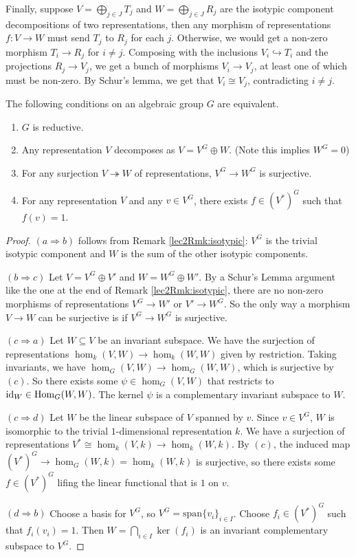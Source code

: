 \begin{remark}
 Finally, suppose $V=\bigoplus_{j\in J}T_j$ and $W=\bigoplus_{j\in J} R_j$ are the isotypic component decompositions of two representations, then any morphism of representations $f\colon V\to W$ must send $T_j$ to $R_j$ for each $j$. Otherwise, we would get a non-zero morphism $T_i\to R_j$ for $i\neq j$. Composing with the inclusions $V_i\hookrightarrow T_i$ and the projections $R_j\to V_j$, we get a bunch of morphisms $V_i\to V_j$, at least one of which must be non-zero. By Schur's lemma, we get that $V_i\cong V_j$, contradicting $i\neq j$.
\end{remark}

\begin{proposition}
 The following conditions on an algebraic group $G$ are equivalent.
 \begin{enumerate}[label=\alph*.]
  \item $G$ is reductive.
  \item Any representation $V$ decomposes as $V=V^G\oplus W$. (Note this implies $W^G=0$)
  \item For any surjection $V\twoheadrightarrow W$ of representations, $V^G\to W^G$ is surjective.
  \item For any representation $V$ and any $v\in V^G$, there exists $f\in (V^*)^G$ such that $f(v)=1$.
 \end{enumerate}
\end{proposition}
\begin{proof}
 $(a\Rightarrow b)$ follows from Remark \ref{lec2Rmk:isotypic}: $V^G$ is the trivial isotypic component and $W$ is the sum of the other isotypic components.
 
 $(b\Rightarrow c)$ Let $V=V^G\oplus V'$ and $W=W^G\oplus W'$. By a Schur's Lemma argument like the one at the end of Remark \ref{lec2Rmk:isotypic}, there are no non-zero morphisms of representations $V^G\to W'$ or $V'\to W^G$. So the only way a morphism $V\to W$ can be surjective is if $V^G\to W^G$ is surjective.
 
 $(c\Rightarrow a)$ Let $W\subseteq V$ be an invariant subspace. We have the surjection of representations $\hom_k(V,W)\to \hom_k(W,W)$ given by restriction. Taking invariants, we have $\hom_G(V,W)\to \hom_G(W,W)$, which is surjective by $(c)$. So there exists some $\psi\in\hom_G(V,W)$ that restricts to $\operatorname{id}_W\in\operatorname{Hom}_G(W,W)$. The kernel $\psi$ is a complementary invariant subspace to $W$.
 
 $(c\Rightarrow d)$ Let $W$ be the linear subspace of $V$ spanned by $v$. Since $v\in V^G$, $W$ is isomorphic to the trivial $1$-dimensional representation $k$. We have a surjection of representations $V^*\cong\hom_k(V,k)\to \hom_k(W,k)$. By $(c)$, the induced map $(V^*)^G\to \hom_G(W,k)=\hom_k(W,k)$ is surjective, so there exists some $f\in (V^*)^G$ lifing the linear functional that is $1$ on $v$.
 
 $(d\Rightarrow b)$ Choose a basis for $V^G$, so $V^G=\mathrm{span}\{v_i\}_{i\in I}$. Choose $f_i\in (V^*)^G$ such that $f_i(v_i)=1$. Then $W=\bigcap_{i\in I} \ker(f_i)$ is an invariant complementary subspace to $V^G$.
\end{proof}
